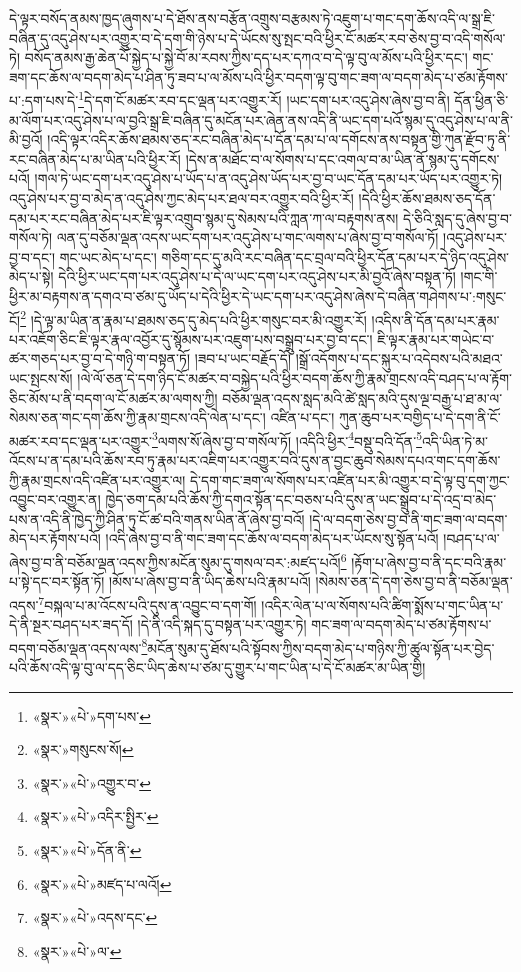 དེ་ལྟར་བསོད་ནམས་ཁྱད་ཞུགས་པ་དེ་ཐོས་ནས་བརྩོན་འགྲུས་བརྩམས་ཏེ་འཇུག་པ་གང་དག་ཆོས་འདི་ལ་སྒྲ་ཇི་བཞིན་དུ་འདུ་ཤེས་པར་འགྱུར་བ་དེ་དག་གི་ཉེས་པ་དེ་ཡོངས་སུ་སྤང་བའི་ཕྱིར་ངོ་མཚར་རབ་ཅེས་བྱ་བ་འདི་གསོལ་ཏེ། བསོད་ནམས་རྒྱ་ཆེན་པོ་སྐྱེད་པ་སྐྱེ་བོ་མ་རབས་ཀྱིས་དད་པར་དཀའ་བ་དེ་ལྟ་བུ་ལ་མོས་པའི་ཕྱིར་དང་། གང་ཟག་དང་ཆོས་ལ་བདག་མེད་པ་ཤིན་ཏུ་ཟབ་པ་ལ་མོས་པའི་ཕྱིར་བདག་ལྟ་བུ་གང་ཟག་ལ་བདག་མེད་པ་ཙམ་རྟོགས་པ་:དག་པས་དེ་\footnote{«སྣར་»«པེ་»དག་པས་}དེ་དག་ངོ་མཚར་རབ་དང་ལྡན་པར་འགྱུར་རོ། །ཡང་དག་པར་འདུ་ཤེས་ཞེས་བྱ་བ་ནི། དོན་ཕྱིན་ཅི་མ་ལོག་པར་འདུ་ཤེས་པ་ལ་བྱའི་སྒྲ་ཇི་བཞིན་དུ་མངོན་པར་ཞེན་ནས་འདི་ནི་ཡང་དག་པའོ་སྙམ་དུ་འདུ་ཤེས་པ་ལ་ནི་མི་བྱའོ། །འདི་ལྟར་འདིར་ཆོས་ཐམས་ཅད་རང་བཞིན་མེད་པ་དོན་དམ་པ་ལ་དགོངས་ནས་བསྟན་གྱི་ཀུན་རྫོབ་ཏུ་ནི་རང་བཞིན་མེད་པ་མ་ཡིན་པའི་ཕྱིར་རོ། །དེས་ན་མཐོང་བ་ལ་སོགས་པ་དང་འགལ་བ་མ་ཡིན་ནོ་སྙམ་དུ་དགོངས་པའོ། །གལ་ཏེ་ཡང་དག་པར་འདུ་ཤེས་པ་ཡོད་པ་ན་འདུ་ཤེས་ཡོད་པར་བྱ་བ་ཡང་དོན་དམ་པར་ཡོད་པར་འགྱུར་ཏེ། འདུ་ཤེས་པར་བྱ་བ་མེད་ན་འདུ་ཤེས་ཀྱང་མེད་པར་ཐལ་བར་འགྱུར་བའི་ཕྱིར་རོ། །དེའི་ཕྱིར་ཆོས་ཐམས་ཅད་དོན་དམ་པར་རང་བཞིན་མེད་པར་ཇི་ལྟར་འགྲུབ་སྙམ་དུ་སེམས་པའི་ཀླན་ཀ་ལ་བརྟགས་ནས། དེ་ཅིའི་སླད་དུ་ཞེས་བྱ་བ་གསོལ་ཏེ། ལན་དུ་བཅོམ་ལྡན་འདས་ཡང་དག་པར་འདུ་ཤེས་པ་གང་ལགས་པ་ཞེས་བྱ་བ་གསོལ་ཏོ། །འདུ་ཤེས་པར་བྱ་བ་དང་། གང་ཡང་མེད་པ་དང་། གཅིག་དང་དུ་མའི་རང་བཞིན་དང་བྲལ་བའི་ཕྱིར་དོན་དམ་པར་དེ་ཉིད་འདུ་ཤེས་མེད་པ་སྟེ། དེའི་ཕྱིར་ཡང་དག་པར་འདུ་ཤེས་པ་དེ་ལ་ཡང་དག་པར་འདུ་ཤེས་པར་མི་བྱའོ་ཞེས་བསྟན་ཏོ། །གང་གི་ཕྱིར་མ་བརྟགས་ན་དགའ་བ་ཙམ་དུ་ཡོད་པ་དེའི་ཕྱིར་དེ་ཡང་དག་པར་འདུ་ཤེས་ཞེས་དེ་བཞིན་གཤེགས་པ་:གསུང་ངོ།\footnote{«སྣར་»གསུངས་སོ།} །དེ་ལྟ་མ་ཡིན་ན་རྣམ་པ་ཐམས་ཅད་དུ་མེད་པའི་ཕྱིར་གསུང་བར་མི་འགྱུར་རོ། །འདིས་ནི་དོན་དམ་པར་རྣམ་པར་འཇོག་ཅིང་ཇི་ལྟར་རྣལ་འབྱོར་དུ་སྙོམས་པར་འཇུག་པས་བསྒྲུབ་པར་བྱ་བ་དང་། ཇི་ལྟར་རྣམ་པར་གཡེང་བ་ཚར་གཅད་པར་བྱ་བ་དེ་གཉི་ག་བསྟན་ཏོ། །ཟབ་པ་ཡང་བརྗོད་དོ། །སྒྲོ་འདོགས་པ་དང་སྐུར་པ་འདེབས་པའི་མཐའ་ཡང་སྤངས་སོ། །ལེ་ལོ་ཅན་དེ་དག་ཉིད་ངོ་མཚར་བ་བསྐྱེད་པའི་ཕྱིར་བདག་ཆོས་ཀྱི་རྣམ་གྲངས་འདི་བཤད་པ་ལ་རྟོག་ཅིང་མོས་པ་ནི་བདག་ལ་ངོ་མཚར་མ་ལགས་ཀྱི། བཅོམ་ལྡན་འདས་སླད་མའི་ཚེ་སླད་མའི་དུས་ལྔ་བརྒྱ་པ་ཐ་མ་ལ་སེམས་ཅན་གང་དག་ཆོས་ཀྱི་རྣམ་གྲངས་འདི་ལེན་པ་དང་། འཛིན་པ་དང་། ཀུན་ཆུབ་པར་བགྱིད་པ་དེ་དག་ནི་ངོ་མཚར་རབ་དང་ལྡན་པར་འགྱུར་\footnote{«སྣར་»«པེ་»འགྱུར་བ་}ལགས་སོ་ཞེས་བྱ་བ་གསོལ་ཏོ། །འདིའི་ཕྱིར་\footnote{«སྣར་»«པེ་»འདིར་སྤྱིར་}བསྡུ་བའི་དོན་\footnote{«སྣར་»«པེ་»དོན་ནི་}འདི་ཡིན་ཏེ་མ་འོངས་པ་ན་དམ་པའི་ཆོས་རབ་ཏུ་རྣམ་པར་འཇིག་པར་འགྱུར་བའི་དུས་ན་བྱང་ཆུབ་སེམས་དཔའ་གང་དག་ཆོས་ཀྱི་རྣམ་གྲངས་འདི་འཛིན་པར་འགྱུར་ལ། དེ་དག་གང་ཟག་ལ་སོགས་པར་འཛིན་པར་མི་འགྱུར་བ་དེ་ལྟ་བུ་དག་ཀྱང་འབྱུང་བར་འགྱུར་ན། ཁྱེད་ཅག་དམ་པའི་ཆོས་ཀྱི་དགའ་སྟོན་དང་བཅས་པའི་དུས་ན་ཡང་སྒྲུབ་པ་དེ་འདྲ་བ་མེད་པས་ན་འདི་ནི་ཁྱེད་ཀྱི་ཤིན་ཏུ་ངོ་ཚ་བའི་གནས་ཡིན་ནོ་ཞེས་བྱ་བའོ། །དེ་ལ་བདག་ཅེས་བྱ་བ་ནི་གང་ཟག་ལ་བདག་མེད་པར་རྟོགས་པའོ། །འདི་ཞེས་བྱ་བ་ནི་གང་ཟག་དང་ཆོས་ལ་བདག་མེད་པར་ཡོངས་སུ་སྟོན་པའོ། །བཤད་པ་ལ་ཞེས་བྱ་བ་ནི་བཅོམ་ལྡན་འདས་ཀྱིས་མངོན་སུམ་དུ་གསལ་བར་:མཛད་པའོ།\footnote{«སྣར་»«པེ་»མཛད་པ་ལའོ།} །རྟོག་པ་ཞེས་བྱ་བ་ནི་དང་བའི་རྣམ་པ་སྟེ་དང་བར་སྟོན་ཏོ། །མོས་པ་ཞེས་བྱ་བ་ནི་ཡིད་ཆེས་པའི་རྣམ་པའོ། །སེམས་ཅན་དེ་དག་ཅེས་བྱ་བ་ནི་བཅོམ་ལྡན་འདས་\footnote{«སྣར་»«པེ་»འདས་དང་}བསྐལ་པ་མ་འོངས་པའི་དུས་ན་འབྱུང་བ་དག་གོ། །འདིར་ལེན་པ་ལ་སོགས་པའི་ཚིག་སྨོས་པ་གང་ཡིན་པ་དེ་ནི་སྔར་བཤད་པར་ཟད་དོ། །དེ་ནི་འདི་སྐད་དུ་བསྟན་པར་འགྱུར་ཏེ། གང་ཟག་ལ་བདག་མེད་པ་ཙམ་རྟོགས་པ་བདག་བཅོམ་ལྡན་འདས་ལས་\footnote{«སྣར་»«པེ་»ལ་}མངོན་སུམ་དུ་ཐོས་པའི་སྟོབས་ཀྱིས་བདག་མེད་པ་གཉིས་ཀྱི་ཚུལ་སྟོན་པར་བྱེད་པའི་ཆོས་འདི་ལྟ་བུ་ལ་དད་ཅིང་ཡིད་ཆེས་པ་ཙམ་དུ་གྱུར་པ་གང་ཡིན་པ་དེ་ངོ་མཚར་མ་ཡིན་གྱི། 